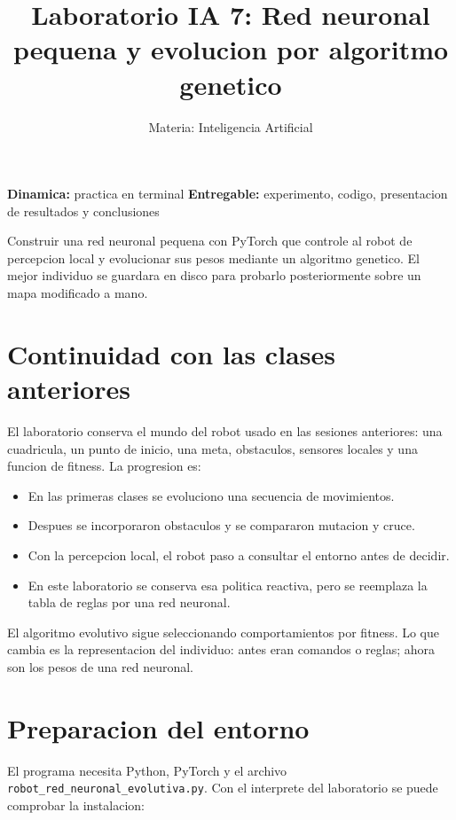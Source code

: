 \documentclass[11pt,a4paper]{article}
\title{\textbf{Laboratorio IA 7: Red neuronal pequena y evolucion por algoritmo genetico}}
\author{Materia: Inteligencia Artificial}
\date{}
\begin{document}
\maketitle

\begin{center}
  \textbf{Dinamica:} practica en terminal\quad
  \textbf{Entregable:} experimento, codigo, presentacion de resultados y conclusiones
\end{center}

\begin{objetivo}
Construir una red neuronal pequena con PyTorch que controle al robot de percepcion local y evolucionar sus pesos mediante un algoritmo genetico. El mejor individuo se guardara en disco para probarlo posteriormente sobre un mapa modificado a mano.
\end{objetivo}

\section{Continuidad con las clases anteriores}
El laboratorio conserva el mundo del robot usado en las sesiones anteriores: una cuadricula, un punto de inicio, una meta, obstaculos, sensores locales y una funcion de fitness. La progresion es:

\begin{itemize}[leftmargin=*]
  \item En las primeras clases se evoluciono una secuencia de movimientos.
  \item Despues se incorporaron obstaculos y se compararon mutacion y cruce.
  \item Con la percepcion local, el robot paso a consultar el entorno antes de decidir.
  \item En este laboratorio se conserva esa politica reactiva, pero se reemplaza la tabla de reglas por una red neuronal.
\end{itemize}

\begin{idea}
El algoritmo evolutivo sigue seleccionando comportamientos por fitness. Lo que cambia es la representacion del individuo: antes eran comandos o reglas; ahora son los pesos de una red neuronal.
\end{idea}

\section{Preparacion del entorno}
El programa necesita Python, PyTorch y el archivo \texttt{robot\_red\_neuronal\_evolutiva.py}. Con el interprete del laboratorio se puede comprobar la instalacion:
\end{document}
